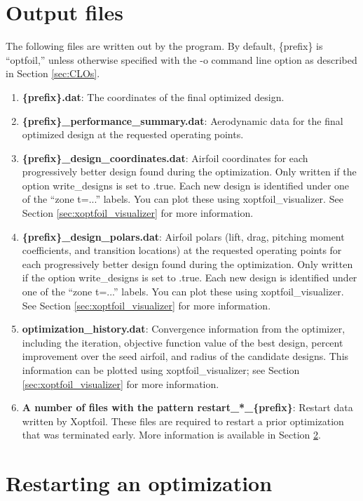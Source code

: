 \documentclass[11pt]{article}
\begin{document}
\section{Output files}\label{sec:output_files}

The following files are written out by the program. By default, \{prefix\} is ``optfoil,''
unless otherwise specified with the -o command line option as described in Section
\ref{sec:CLOs}.

\begin{enumerate}
\item{\textbf{\{prefix\}.dat}: The coordinates of the final optimized design.}
\item{\textbf{\{prefix\}\_performance\_summary.dat}: Aerodynamic data for the final optimized
design at the requested operating points.}
\item{\textbf{\{prefix\}\_design\_coordinates.dat}: Airfoil coordinates for each
progressively better design found during the optimization.  Only written if the option
write\_designs is set to .true.  Each new design is identified under one of the ``zone
t=...'' labels.  You can plot these using xoptfoil\_visualizer. See Section 
\ref{sec:xoptfoil_visualizer} for more information.}
\item{\textbf{\{prefix\}\_design\_polars.dat}: Airfoil polars (lift, drag, pitching
moment coefficients, and transition locations) at
the requested operating points for each progressively better design found during the 
optimization.  Only written if the option write\_designs is set to .true.  Each new design
is identified under one of the ``zone t=...'' labels.  You can plot these using 
xoptfoil\_visualizer. See Section \ref{sec:xoptfoil_visualizer} for more information.}
\item{\textbf{optimization\_history.dat}: Convergence information from the optimizer,
including the iteration, objective function value of the best design, percent improvement
over the seed airfoil, and radius of the candidate designs. This information can be
plotted using xoptfoil\_visualizer; see Section \ref{sec:xoptfoil_visualizer} for more
information.}
\item{\textbf{A number of files with the pattern restart\_*\_\{prefix\}}: Restart data
written by Xoptfoil.  These files are required to restart a prior optimization that was
terminated early. More information is available in Section \ref{sec:restarting}.}
\end{enumerate}

\section{Restarting an optimization}\label{sec:restarting}
\end{document}
